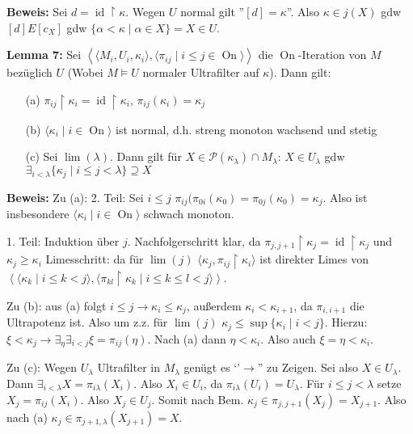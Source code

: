 \documentclass[a4paper,fontsize=11pt]{scrartcl}
\newcommand{\On}{\operatorname{On}}
\newcommand{\id}{\operatorname{id}}
\begin{document}
	{\bf Beweis:} Sei $d=\id\upharpoonright\kappa$. 
		Wegen $U$ normal gilt ''$[d]=\kappa$''.
		Also $\kappa\in j(X)$ gdw $[d]E[c_X]$ gdw $\{\alpha<\kappa\mid\alpha\in X\}=X\in U$.

{\bf Lemma 7:} Sei $\left\langle\langle M_i, U_i, \kappa_i\rangle, \langle\pi_{ij}\mid i\le j\in \On\rangle\right\rangle$ die $\On$-Iteration von $M$ bezüglich $U$
	(Wobei $M\models U$ normaler Ultrafilter auf $\kappa$).
	Dann gilt: \begin{itemize} 
		\item[(a)] $\pi_{ij}\upharpoonright\kappa_i=\id\upharpoonright\kappa_i$, $\pi_{ij}(\kappa_i)=\kappa_j$
		\item[(b)] $\langle \kappa_i\mid i\in\On\rangle$ ist normal, d.h. streng monoton wachsend und stetig
		\item[(c)] Sei $\lim(\lambda)$. Dann gilt für $X\in\mathcal P(\kappa_{\lambda})\cap M_{\lambda}$:
			$X\in U_{\lambda}$ gdw $\exists_{i<\lambda}\{\kappa_j\mid i\le j<\lambda\}\supseteq X$
	\end{itemize}

	{\bf Beweis:} Zu (a): 2. Teil: Sei $i\le j$ $\pi_{ij}(\pi_{0i}(\kappa_0)=\pi_{0j}(\kappa_0)=\kappa_j$.
		Also ist insbesondere $\langle \kappa_i\mid i\in\On\rangle$ schwach monoton.

		1. Teil: Induktion über $j$. Nachfolgerschritt klar, da $\pi_{j,j+1}\upharpoonright\kappa_j=\id\upharpoonright\kappa_j$ und $\kappa_j\ge\kappa_i$
		Limesschritt: da für $\lim(j)$ $\langle \kappa_j,\pi_{ij}\upharpoonright\kappa_i\rangle$ ist direkter Limes von $\left\langle\langle \kappa_k\mid i\le k<j\rangle, \langle \pi_{kl}\upharpoonright\kappa_k\mid i\le k \le l<j\rangle\right\rangle$.

		Zu (b): aus (a) folgt $i\le j\to \kappa_i\le \kappa_j$, außerdem $\kappa_i<\kappa_{i+1}$, da $\pi_{i,i+1}$ die Ultrapotenz ist.
		Also um z.z. für $\lim(j)$ $\kappa_j\le \sup\{\kappa_i\mid i<j\}$.
		Hierzu: $\xi<\kappa_j\to\exists_\eta\exists_{i<j} \xi=\pi_{ij}(\eta)$.
		Nach (a) dann $\eta<\kappa_i$.
		Also auch $\xi=\eta<\kappa_i$.

		Zu (c): Wegen $U_{\lambda}$ Ultrafilter in $M_{\lambda}$ genügt es `'$\to$'' zu Zeigen. 
		Sei also $X\in U_{\lambda}$.
		Dann $\exists_{i<\lambda} X=\pi_{i\lambda}(X_i)$.
		Also $X_i\in U_i$, da $\pi_{i\lambda}(U_i)=U_{\lambda}$.
		Für $i\le j <\lambda$ setze $X_j=\pi_{ij}(X_i)$.
		Also $X_j\in U_j$.
		Somit nach Bem. $\kappa_j\in \pi_{j,j+1}(X_j)=X_{j+1}$.
		Also nach (a) $\kappa_j\in \pi_{j+1,\lambda}(X_{j+1})=X$.
\end{document}
